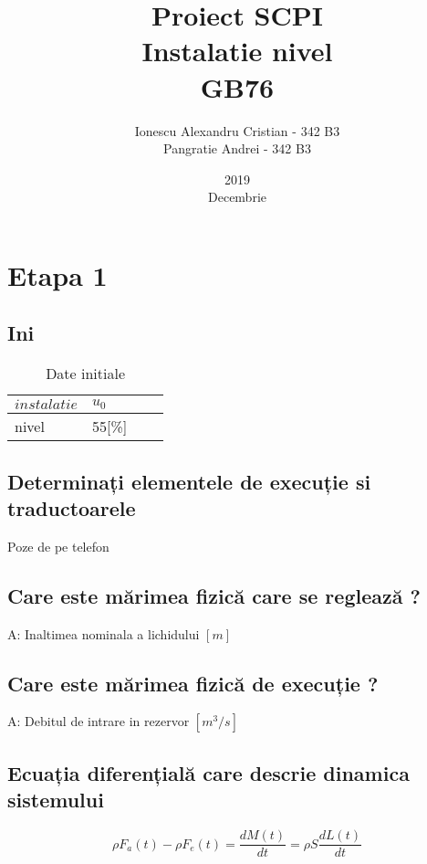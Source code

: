 \documentclass[12pt,english]{article}
\title{Proiect SCPI\\ Instalatie nivel\\ GB76}
\date{2019\\ Decembrie}
\author{Ionescu Alexandru Cristian - 342 B3\\Pangratie Andrei - 342 B3}
\begin{document}
\maketitle
\newpage

\tableofcontents
\newpage

\section {Etapa 1}
\subsection {Ini}

\begin{table}[H]
  \centering
  \begin{tabular}{|l|l|l|l|}
    \hline
    $instalatie$ & $u_0$ \\
    \hline
    nivel & 55[\%] \\
    \hline
  \end{tabular}
  \caption{Date initiale}
\end{table}

\subsection {Determinați elementele de execuție si traductoarele}
Poze de pe telefon

\subsection {Care este mărimea fizică care se reglează ?}
A: Inaltimea nominala a lichidului $[m]$

\subsection {Care este mărimea fizică de execuție ?}
A: Debitul de intrare in rezervor $[m^3/s]$

\subsection {Ecuația diferențială care descrie dinamica sistemului}
\begin{center}
  \begin{equation*}
  \rho F_{a}( t) -\rho F_{e}( t) =\dfrac{dM( t)}{dt} =\rho S\dfrac{dL( t)}{dt}
  \end{equation*}
\end{center}
\end{document}
